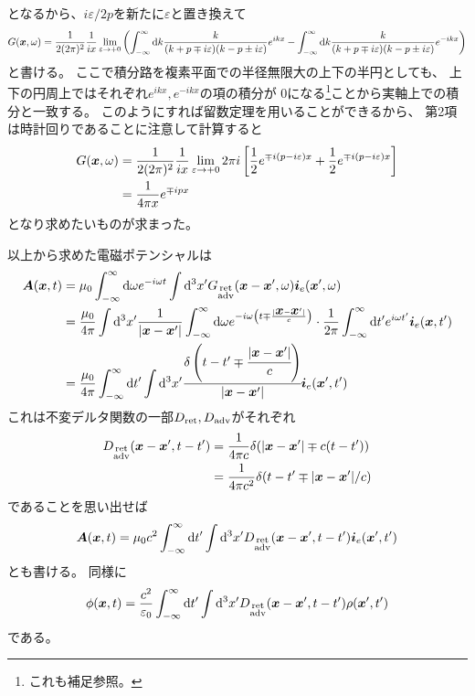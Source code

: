 \documentclass[a4paper, 10pt]{jsarticle}
\theoremstyle{definition}
\def\vec#1{\mbox{\boldmath $#1$}}
\newcommand{\ddif}{{\rm d}}
\begin{document}
となるから、$i\varepsilon/2p$を新たに$\varepsilon$と置き換えて
\begin{align}
	G(\vec{x}, \omega)
	= \frac{1}{2(2\pi)^2} \frac{1}{ix} \lim_{\varepsilon \to +0} \left(
	\int_{-\infty}^{\infty} \ddif k
	\frac{k}{(k + p \mp i\varepsilon)(k - p \pm i\varepsilon)} e^{ikx}
	- \int_{-\infty}^{\infty} \ddif k
	\frac{k}{(k + p \mp i\varepsilon)(k - p \pm i\varepsilon)} e^{-ikx}
	\right)
	\label{IntOfG}
\end{align}
と書ける。
ここで積分路を複素平面での半径無限大の上下の半円としても、
上下の円周上ではそれぞれ$e^{ikx}, e^{-ikx}$の項の積分が
0になる\footnote{これも補足参照。}ことから実軸上での積分と一致する。
このようにすれば留数定理を用いることができるから、
第2項は時計回りであることに注意して計算すると
\begin{align}
	G(\vec{x}, \omega)
	&= \frac{1}{2(2\pi)^2} \frac{1}{ix} \lim_{\varepsilon \to +0} 2\pi i \left[
		\frac{1}{2} e^{\mp i(p - i\varepsilon)x}
		+ \frac{1}{2} e^{\mp i(p - i\varepsilon)x}
	\right] \\
	&= \frac{1}{4\pi x} e^{\mp ipx}
\end{align}
となり求めたいものが求まった。

以上から求めた電磁ポテンシャルは
\begin{align}
	\vec{A}(\vec{x}, t)
	&= \mu_0 \int_{-\infty}^{\infty} \ddif \omega e^{-i\omega t} \int \ddif^3 x'
	G_{\substack{\rm ret \\ \rm adv}} (\vec{x} - \vec{x}', \omega)
	\vec{i}_e(\vec{x}', \omega) \\
	&= \frac{\mu_0}{4\pi} \int \ddif^3 x' \frac{1}{|\vec{x} - \vec{x}'|}
	\int_{-\infty}^{\infty} \ddif \omega
	e^{-i\omega \left( t \mp \frac{|\vec{x} - \vec{x}'|}{c} \right)}
	\cdot \frac{1}{2\pi} \int_{-\infty}^{\infty} \ddif t' e^{i\omega t'}
	\vec{i}_e(\vec{x}, t') \\
	&= \frac{\mu_0}{4\pi} \int_{-\infty}^{\infty} \ddif t'
	\int \ddif^3 x'
	\cfrac{\delta \left( t - t' \mp \cfrac{|\vec{x} - \vec{x}'|}{c}\right)}
	{|\vec{x} - \vec{x}'|}
	\vec{i}_e (\vec{x}', t')
\end{align}
これは不変デルタ関数の一部$D_{\rm ret}, D_{\rm adv}$がそれぞれ
\begin{align}
	D_{\substack{\rm ret \\ \rm adv}} (\vec{x} - \vec{x}', t - t')
	&= \frac{1}{4\pi c} \delta(|\vec{x} - \vec{x}'| \mp c(t - t')) \\
	&= \frac{1}{4\pi c^2} \delta(t - t' \mp |\vec{x} - \vec{x}'|/c)
\end{align}
であることを思い出せば
\begin{align}
	\vec{A}(\vec{x}, t) = \mu_0 c^2 \int_{-\infty}^{\infty} \ddif t'
	\int \ddif^3 x'
	D_{\substack{\rm ret \\ \rm adv}} (\vec{x} - \vec{x}', t - t')
	\vec{i}_e (\vec{x}', t')
\end{align}
とも書ける。
同様に
\begin{align}
	\phi(\vec{x}, t) = \frac{c^2}{\varepsilon_0}
	\int_{-\infty}^{\infty} \ddif t' \int \ddif^3 x'
	D_{\substack{\rm ret \\ \rm adv}} (\vec{x} - \vec{x}', t - t')
	\rho(\vec{x}', t')
\end{align}
である。
\end{document}
